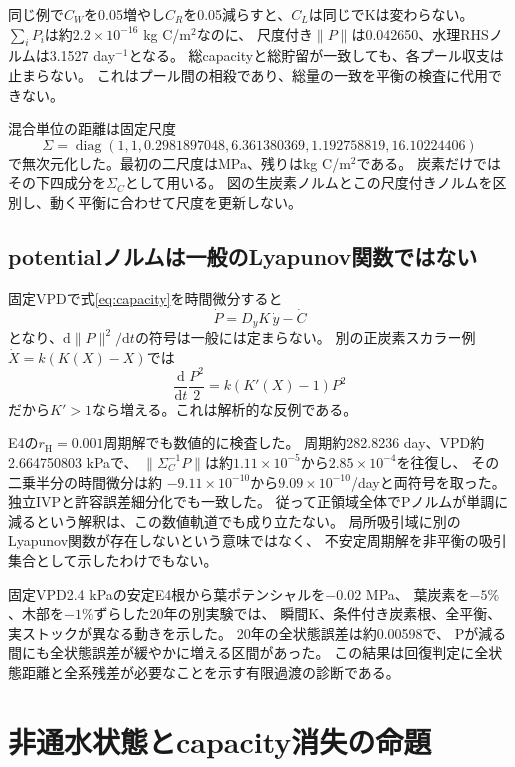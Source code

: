 \documentclass[a4paper,11pt]{ltjsarticle}
\newcommand{\dd}{\mathrm{d}}
\newcommand{\diag}{\operatorname{diag}}
\begin{document}
同じ例で$C_W$を0.05増やし$C_R$を0.05減らすと、$C_L$は同じでKは変わらない。
$\sum_iP_i$は約$2.2\times10^{-16}$ kg C/m$^2$なのに、
尺度付き$\|P\|$は0.042650、水理RHSノルムは3.1527 day$^{-1}$となる。
総capacityと総貯留が一致しても、各プール収支は止まらない。
これはプール間の相殺であり、総量の一致を平衡の検査に代用できない。

混合単位の距離は固定尺度
\begin{equation}\label{eq:scale}
 \Sigma=\diag(1,1,0.2981897048,6.361380369,1.192758819,16.10224406)
\end{equation}
で無次元化した。最初の二尺度はMPa、残りはkg C/m$^2$である。
炭素だけではその下四成分を$\Sigma_C$として用いる。
図の生炭素ノルムとこの尺度付きノルムを区別し、動く平衡に合わせて尺度を更新しない。

\subsection{potentialノルムは一般のLyapunov関数ではない}
固定VPDで式\eqref{eq:capacity}を時間微分すると
\begin{equation}
 \dot P=D_yK\,\dot y-\dot C
\end{equation}
となり、$\dd\|P\|^2/\dd t$の符号は一般には定まらない。
別の正炭素スカラー例$\dot X=k(K(X)-X)$では
\begin{equation}
 \frac{\dd}{\dd t}\frac{P^2}{2}=k(K'(X)-1)P^2
\end{equation}
だから$K'>1$なら増える。これは解析的な反例である。

E4の$r_{\mathrm H}=0.001$周期解でも数値的に検査した。
周期約282.8236 day、VPD約2.664750803 kPaで、
$\|\Sigma_C^{-1}P\|$は約$1.11\times10^{-5}$から$2.85\times10^{-4}$を往復し、
その二乗半分の時間微分は約
$-9.11\times10^{-10}$から$9.09\times10^{-10}$/dayと両符号を取った。
独立IVPと許容誤差細分化でも一致した。
従って正領域全体でPノルムが単調に減るという解釈は、この数値軌道でも成り立たない。
局所吸引域に別のLyapunov関数が存在しないという意味ではなく、
不安定周期解を非平衡の吸引集合として示したわけでもない。

固定VPD2.4 kPaの安定E4根から葉ポテンシャルを$-0.02$ MPa、
葉炭素を$-5\%$、木部を$-1\%$ずらした20年の別実験では、
瞬間K、条件付き炭素根、全平衡、実ストックが異なる動きを示した。
20年の全状態誤差は約0.00598で、
Pが減る間にも全状態誤差が緩やかに増える区間があった。
この結果は回復判定に全状態距離と全系残差が必要なことを示す有限過渡の診断である。

\section{非通水状態とcapacity消失の命題}\label{sec:shutdown}
\end{document}
